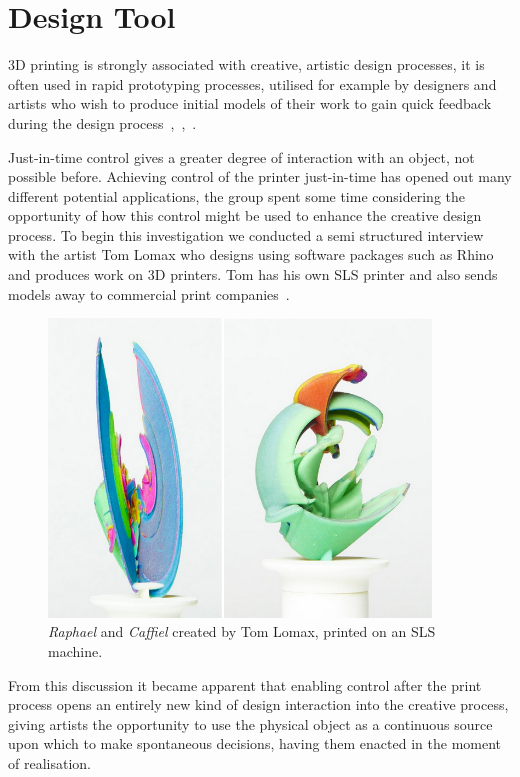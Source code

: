 \documentclass[pdftex, 11pt]{report} %
\begin{document}
\section{Design Tool}
3D printing is strongly associated with creative, artistic design processes, it is often used in rapid prototyping processes, utilised for example by designers and artists who wish to produce initial models of their work to gain quick feedback during the design process~\cite{Fifield1998},~\cite{Bourell2012},~\cite{Bourell2009}.

	Just-in-time control gives a greater degree of interaction with an object, not possible before. Achieving control of the printer just-in-time has opened out many different potential applications, the group spent some time considering the opportunity of how this control might be used to enhance the creative design process. To begin this investigation we conducted a semi structured interview with the artist Tom Lomax who designs using software packages such as Rhino and produces work on 3D printers. Tom has his own SLS printer and also sends models away to commercial print companies~\cite{Lomax2014}. 

\begin{figure}[H]
  \centering
  \includegraphics[width=4in]{Lomax.png}
  \caption{\textit{Raphael} and \textit{Caffiel} created by Tom Lomax, printed on an SLS machine.}
  \label{figure:Lomax}
\end{figure}

From this discussion it became apparent that enabling control after the print process opens an entirely new kind of design interaction into the creative process, giving artists the opportunity to use the physical object as a continuous source upon which to make spontaneous decisions, having them enacted in the moment of realisation. 
\end{document}
